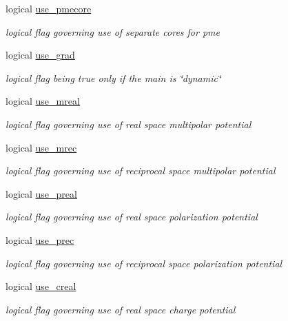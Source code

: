 \begin{DoxyCompactItemize}
logical \hyperlink{classpotent_a43e7f1f94b7cf392cd75a697c69136c0}{use\-\_\-pmecore}
\begin{DoxyCompactList}\small\item\em logical flag governing use of separate cores for pme \end{DoxyCompactList}\item 
logical \hyperlink{classpotent_a46397d2d8b4246feb7b51ccfc311fc83}{use\-\_\-grad}
\begin{DoxyCompactList}\small\item\em logical flag being true only if the main is \char`\"{}dynamic\char`\"{} \end{DoxyCompactList}\item 
logical \hyperlink{classpotent_a05e2d1fb2c7f8b1830a81783b56c5dc5}{use\-\_\-mreal}
\begin{DoxyCompactList}\small\item\em logical flag governing use of real space multipolar potential \end{DoxyCompactList}\item 
logical \hyperlink{classpotent_abf144fe64e3ac4d546a4e9a6c95c4c8a}{use\-\_\-mrec}
\begin{DoxyCompactList}\small\item\em logical flag governing use of reciprocal space multipolar potential \end{DoxyCompactList}\item 
logical \hyperlink{classpotent_ad8fc08dbc413d1d6c9b637c1825d2571}{use\-\_\-preal}
\begin{DoxyCompactList}\small\item\em logical flag governing use of real space polarization potential \end{DoxyCompactList}\item 
logical \hyperlink{classpotent_a7dc24934e4ea98ba3cdfc54ab99b2d13}{use\-\_\-prec}
\begin{DoxyCompactList}\small\item\em logical flag governing use of reciprocal space polarization potential \end{DoxyCompactList}\item 
logical \hyperlink{classpotent_a9cacbd79d7d6710802eb97d9fe33b3b7}{use\-\_\-creal}
\begin{DoxyCompactList}\small\item\em logical flag governing use of real space charge potential \end{DoxyCompactList}\item 

\end{DoxyCompactItemize}
